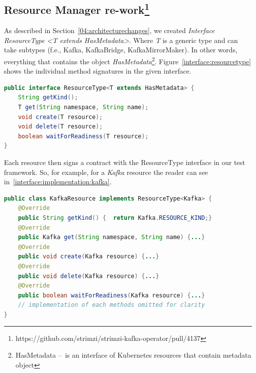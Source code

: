 \subsection{Resource Manager re-work\protect\footnote{https://github.com/strimzi/strimzi-kafka-operator/pull/4137}}
\label{05:sub:sec:resourcemanager}

As described in Section~\ref{04:architecturechanges}, we created \emph{Interface ResourceType <T extends HasMetadata>}.
Where \emph{T} is a generic type and can take subtypes (f.e., Kafka, KafkaBridge, KafkaMirrorMaker).
In other words, everything that contains the object \emph{HasMetadata}\footnote{HasMetadata \---\ is an interface of Kubernetes resources that contain metadata object}.
Figure~\ref{interface:resourcetype} shows the individual method signatures in the given interface.

\begin{lstlisting}[language=Java,label=interface:resourcetype,caption=Interface used across all resources,frame=tb]
public interface ResourceType<T extends HasMetadata> {
    String getKind();
    T get(String namespace, String name);
    void create(T resource);
    void delete(T resource);
    boolean waitForReadiness(T resource);
}
\end{lstlisting}
Each resource then signs a contract with the ResourceType interface in our test framework.
So, for example, for a \emph{Kafka} resource the reader can see in~\ref{interface:implementation:kafka}.
\begin{lstlisting}[language=Java,label=interface:implementation:kafka,caption=Kafka resource sings contract with ResourceType interface,frame=tb]
public class KafkaResource implements ResourceType<Kafka> {
    @Override
    public String getKind() {  return Kafka.RESOURCE_KIND;}
    @Override
    public Kafka get(String namespace, String name) {...}
    @Override
    public void create(Kafka resource) {...}
    @Override
    public void delete(Kafka resource) {...}
    @Override
    public boolean waitForReadiness(Kafka resource) {...}
    // implementation of each methods omitted for clarity
}
\end{lstlisting}

